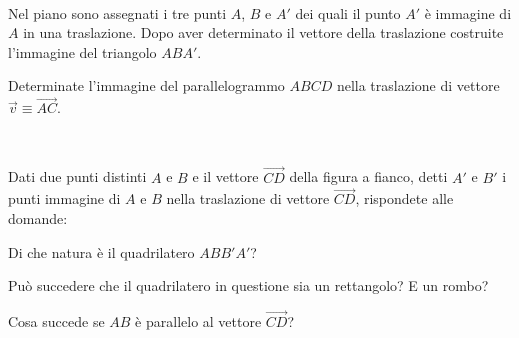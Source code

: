 \begin{esercizio}
\label{ese:}
~

\noindent\begin{minipage}{.70\textwidth}
Nel piano sono assegnati i tre punti \(A\), \(B\) e \(A'\) dei quali il 
punto \(A'\) è immagine di \(A\) in una traslazione. Dopo aver 
determinato il vettore della traslazione costruite l'immagine del 
triangolo \(ABA'\).
\end{minipage} 
\begin{minipage}{.25\textwidth}
\begin{inaccessibleblock}
\begin{center}  \end{center}
\end{inaccessibleblock}
\end{minipage}
\end{esercizio}

\begin{esercizio}
\label{ese:8.45} %
Determinate l'immagine del parallelogrammo \(ABCD\) nella traslazione 
di vettore \(\vec{v} \equiv \overrightarrow{AC}\).
\end{esercizio}

\begin{esercizio}
\label{ese:}
~

\noindent\begin{minipage}{.70\textwidth}
Dati due punti distinti \(A\) e \(B\) e il vettore \(\overrightarrow{CD}\) 
della figura a fianco, detti \(A'\) e \(B'\) i punti immagine di \(A\) e 
\(B\) nella traslazione di vettore \(\overrightarrow{CD}\), rispondete 
alle domande:
\begin{enumeratea}
\item Di che natura è il quadrilatero \(ABB'A'\)?
\item Può succedere che il quadrilatero in questione sia un 
rettangolo? E un rombo?
\item Cosa succede se \(AB\) è parallelo al vettore 
\(\overrightarrow{CD}\)?
\end{enumeratea}
\end{minipage} 
\begin{minipage}{.28\textwidth}
\begin{inaccessibleblock}
\begin{center}  \end{center}
\end{inaccessibleblock}
\end{minipage}
\end{esercizio}

